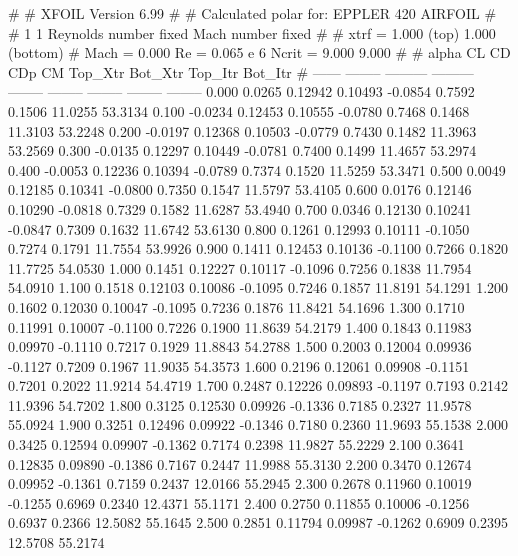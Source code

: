 #  
#       XFOIL         Version 6.99
#  
# Calculated polar for: EPPLER 420 AIRFOIL                              
#  
# 1 1 Reynolds number fixed          Mach number fixed         
#  
# xtrf =   1.000 (top)        1.000 (bottom)  
# Mach =   0.000     Re =     0.065 e 6     Ncrit =   9.000  9.000
#  
#   alpha    CL        CD       CDp       CM     Top_Xtr  Bot_Xtr  Top_Itr  Bot_Itr
#  ------ -------- --------- --------- -------- -------- -------- -------- --------
   0.000   0.0265   0.12942   0.10493  -0.0854   0.7592   0.1506  11.0255  53.3134
   0.100  -0.0234   0.12453   0.10555  -0.0780   0.7468   0.1468  11.3103  53.2248
   0.200  -0.0197   0.12368   0.10503  -0.0779   0.7430   0.1482  11.3963  53.2569
   0.300  -0.0135   0.12297   0.10449  -0.0781   0.7400   0.1499  11.4657  53.2974
   0.400  -0.0053   0.12236   0.10394  -0.0789   0.7374   0.1520  11.5259  53.3471
   0.500   0.0049   0.12185   0.10341  -0.0800   0.7350   0.1547  11.5797  53.4105
   0.600   0.0176   0.12146   0.10290  -0.0818   0.7329   0.1582  11.6287  53.4940
   0.700   0.0346   0.12130   0.10241  -0.0847   0.7309   0.1632  11.6742  53.6130
   0.800   0.1261   0.12993   0.10111  -0.1050   0.7274   0.1791  11.7554  53.9926
   0.900   0.1411   0.12453   0.10136  -0.1100   0.7266   0.1820  11.7725  54.0530
   1.000   0.1451   0.12227   0.10117  -0.1096   0.7256   0.1838  11.7954  54.0910
   1.100   0.1518   0.12103   0.10086  -0.1095   0.7246   0.1857  11.8191  54.1291
   1.200   0.1602   0.12030   0.10047  -0.1095   0.7236   0.1876  11.8421  54.1696
   1.300   0.1710   0.11991   0.10007  -0.1100   0.7226   0.1900  11.8639  54.2179
   1.400   0.1843   0.11983   0.09970  -0.1110   0.7217   0.1929  11.8843  54.2788
   1.500   0.2003   0.12004   0.09936  -0.1127   0.7209   0.1967  11.9035  54.3573
   1.600   0.2196   0.12061   0.09908  -0.1151   0.7201   0.2022  11.9214  54.4719
   1.700   0.2487   0.12226   0.09893  -0.1197   0.7193   0.2142  11.9396  54.7202
   1.800   0.3125   0.12530   0.09926  -0.1336   0.7185   0.2327  11.9578  55.0924
   1.900   0.3251   0.12496   0.09922  -0.1346   0.7180   0.2360  11.9693  55.1538
   2.000   0.3425   0.12594   0.09907  -0.1362   0.7174   0.2398  11.9827  55.2229
   2.100   0.3641   0.12835   0.09890  -0.1386   0.7167   0.2447  11.9988  55.3130
   2.200   0.3470   0.12674   0.09952  -0.1361   0.7159   0.2437  12.0166  55.2945
   2.300   0.2678   0.11960   0.10019  -0.1255   0.6969   0.2340  12.4371  55.1171
   2.400   0.2750   0.11855   0.10006  -0.1256   0.6937   0.2366  12.5082  55.1645
   2.500   0.2851   0.11794   0.09987  -0.1262   0.6909   0.2395  12.5708  55.2174
